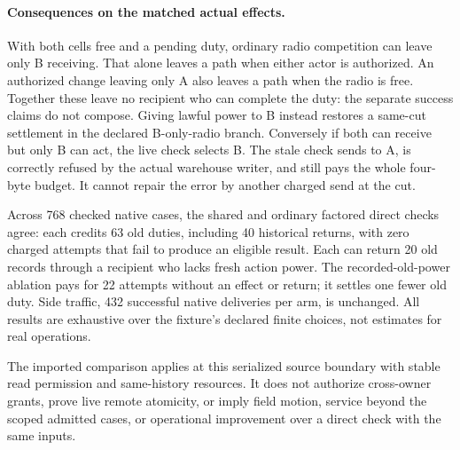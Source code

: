 \documentclass{article}
\begin{document}
\paragraph{Consequences on the matched actual effects.}
With both cells free and a pending duty, ordinary radio
competition can leave only B receiving. That alone leaves a path
when either actor is authorized. An authorized change
leaving only A also leaves a path when the radio is free.
Together these leave no recipient who can complete the duty:
the separate success claims do not compose. Giving lawful
power to B instead restores a same-cut settlement in the
declared B-only-radio branch. Conversely if both can receive
but only B can act, the live check selects B. The stale check
sends to A, is correctly refused by the actual warehouse
writer, and still pays the whole four-byte budget. It cannot
repair the error by another charged send at the cut.

Across 768 checked native cases, the shared and ordinary
factored direct checks agree: each credits 63 old duties,
including 40 historical returns, with zero charged attempts
that fail to produce an eligible result. Each can return
20 old records through a recipient who lacks fresh action
power. The recorded-old-power ablation pays for 22 attempts
without an effect or return; it settles one fewer old duty.
Side traffic, 432 successful native deliveries per arm, is
unchanged. All results are exhaustive over the fixture's
declared finite choices, not estimates for real operations.

The imported comparison applies at this serialized source
boundary with stable read permission and same-history
resources. It does not authorize cross-owner grants, prove live
remote atomicity, or imply field motion, service beyond the
scoped admitted cases, or operational improvement over a
direct check with the same inputs.
\end{document}
